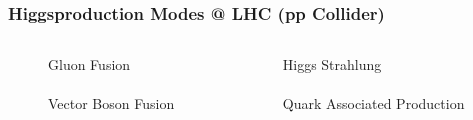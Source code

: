 \documentclass[xcolor={usenames,dvipsnames,svgnames,table}]{beamer}
\begin{document}
\begin{frame}
    \frametitle{Higgsproduction Modes @ LHC (pp Collider)}
    \begin{columns}
    \begin{column}{0.49\textwidth}
    \begin{minipage}{0.9\textwidth}
        \begin{figure}[t]
        \centering \textcolor{color1}{Gluon Fusion}\\
        \vspace{0.5cm}
        \centering \\
        \vspace{0.5cm}
        \centering \textcolor{color1}{Vector Boson Fusion}\\
        \vspace{0.5cm}
        \centering 
        \end{figure}
    \end{minipage}
    \end{column}
    \begin{column}{0.49\textwidth}
    \begin{minipage}{0.9\textwidth}
        \begin{figure}[t]
        \centering \textcolor{color1}{Higgs Strahlung}\\
        \vspace{0.5cm}
        \centering \\
        \vspace{0.5cm}
        \centering \textcolor{color1}{Quark Associated Production}\\
        \vspace{0.5cm}
        \centering 
        \end{figure}
    \end{minipage}
    \end{column}
\end{columns}
\end{frame}
\end{document}
